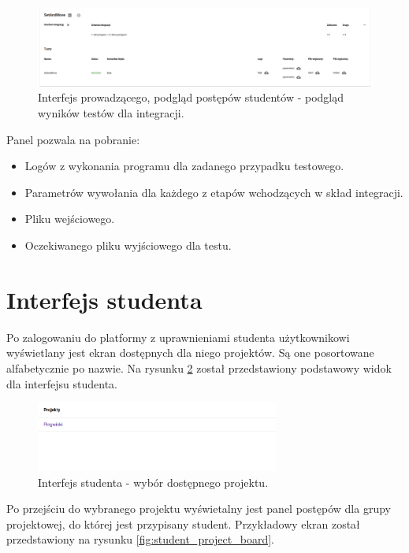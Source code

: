 \begin{figure}[h]
    \centering
    \includegraphics[width = 15cm]{chapter04/lecturer_preview_integration_tests.png}
    \caption{Interfejs prowadzącego, podgląd postępów studentów - podgląd wyników testów dla integracji.}
    \label{fig:lecturer-preview-integration-tests}
\end{figure}

Panel pozwala na pobranie:
\begin{itemize}
    \item Logów z wykonania programu dla zadanego przypadku testowego.
    \item Parametrów wywołania dla każdego z etapów wchodzących w skład integracji.
    \item Pliku wejściowego.
    \item Oczekiwanego pliku wyjściowego dla testu.
\end{itemize}


\section{Interfejs studenta}

Po zalogowaniu do platformy z uprawnieniami studenta użytkownikowi wyświetlany jest ekran dostępnych dla niego projektów.
Są one posortowane alfabetycznie po nazwie.
Na rysunku \ref{fig:student_projects} został przedstawiony podstawowy widok dla interfejsu studenta.

\begin{figure}[h]
    \centering
    \includegraphics[width = 8cm]{chapter04/student_projects.png}
    \caption{Interfejs studenta - wybór dostępnego projektu.}
    \label{fig:student_projects}
\end{figure}

Po przejściu do wybranego projektu wyświetalny jest panel postępów dla grupy projektowej, do której jest przypisany student.
Przykładowy ekran został przedstawiony na rysunku \ref{fig:student_project_board}.

